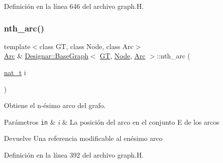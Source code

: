 Definición en la línea 646 del archivo graph.\+H.

\mbox{\label{class_designar_1_1_base_graph_a3fed87a68cc763e63369558423235e00}} 
\subsubsection{\texorpdfstring{nth\+\_\+arc()}{nth\_arc()}\hspace{0.1cm}{\footnotesize\ttfamily [1/2]}}
{\footnotesize\ttfamily template$<$class GT, class Node, class Arc$>$ \\
\hyperlink{namespace_designar_a3f55fb5513d62ff47cbc8f72b8e95d6f}{Arc} \& \hyperlink{class_designar_1_1_base_graph}{Designar\+::\+Base\+Graph}$<$ \hyperlink{demo-buildgraph_8_c_a3001c40d2c31ca87ed96cd7d1334a55e}{GT}, \hyperlink{namespace_designar_a5af326c65aa2bd26b26c410f2030d09e}{Node}, \hyperlink{namespace_designar_a3f55fb5513d62ff47cbc8f72b8e95d6f}{Arc} $>$\+::nth\+\_\+arc (\begin{DoxyParamCaption}\item[{\hyperlink{namespace_designar_aa72662848b9f4815e7bf31a7cf3e33d1}{nat\+\_\+t}}]{i }\end{DoxyParamCaption})\hspace{0.3cm}{\ttfamily [inline]}}



Obtiene el n-\/ésimo arco del grafo. 


\begin{DoxyParams}[1]{Parámetros}
\mbox{\tt in}  & {\em i} & La posición del arco en el conjunto E de los arcos \\
\hline
\end{DoxyParams}
\begin{DoxyReturn}{Devuelve}
Una referencia modificable al enésimo arco 
\end{DoxyReturn}


Definición en la línea 392 del archivo graph.\+H.

\mbox{\label{class_designar_1_1_base_graph_a2253d6f1e0d163f52ce1b928001e830d}} 
